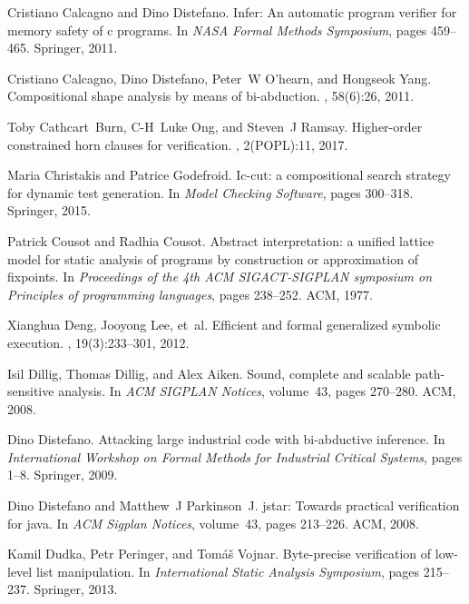 \begin{thebibliography}{10}
Cristiano Calcagno and Dino Distefano.
\newblock Infer: An automatic program verifier for memory safety of c programs.
\newblock In {\em NASA Formal Methods Symposium}, pages 459--465. Springer,
  2011.

Cristiano Calcagno, Dino Distefano, Peter~W O’hearn, and Hongseok Yang.
\newblock Compositional shape analysis by means of bi-abduction.
, 58(6):26, 2011.

Toby Cathcart~Burn, C-H~Luke Ong, and Steven~J Ramsay.
\newblock Higher-order constrained horn clauses for verification.
, 2(POPL):11,
  2017.

Maria Christakis and Patrice Godefroid.
\newblock Ic-cut: a compositional search strategy for dynamic test generation.
\newblock In {\em Model Checking Software}, pages 300--318. Springer, 2015.

Patrick Cousot and Radhia Cousot.
\newblock Abstract interpretation: a unified lattice model for static analysis
  of programs by construction or approximation of fixpoints.
\newblock In {\em Proceedings of the 4th ACM SIGACT-SIGPLAN symposium on
  Principles of programming languages}, pages 238--252. ACM, 1977.

Xianghua Deng, Jooyong Lee, et~al.
\newblock Efficient and formal generalized symbolic execution.
, 19(3):233--301, 2012.

Isil Dillig, Thomas Dillig, and Alex Aiken.
\newblock Sound, complete and scalable path-sensitive analysis.
\newblock In {\em ACM SIGPLAN Notices}, volume~43, pages 270--280. ACM, 2008.

Dino Distefano.
\newblock Attacking large industrial code with bi-abductive inference.
\newblock In {\em International Workshop on Formal Methods for Industrial
  Critical Systems}, pages 1--8. Springer, 2009.

Dino Distefano and Matthew~J Parkinson~J.
\newblock jstar: Towards practical verification for java.
\newblock In {\em ACM Sigplan Notices}, volume~43, pages 213--226. ACM, 2008.

Kamil Dudka, Petr Peringer, and Tom{\'a}{\v{s}} Vojnar.
\newblock Byte-precise verification of low-level list manipulation.
\newblock In {\em International Static Analysis Symposium}, pages 215--237.
  Springer, 2013.


\end{thebibliography}
